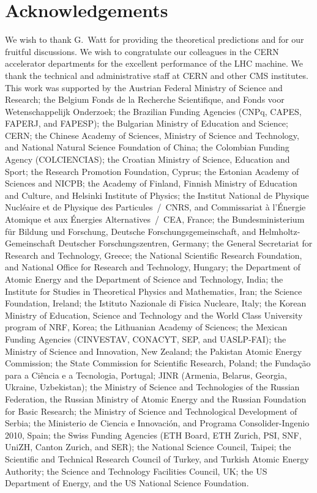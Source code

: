 \section*{Acknowledgements}
\label{sec:acknowledgements}

We wish to thank G.\ Watt for providing the theoretical predictions and for
our fruitful discussions.
We wish to congratulate our colleagues in the CERN accelerator departments 
for the excellent performance of the LHC machine. We thank the technical 
and administrative staff at CERN and other CMS institutes. This work was 
supported by the Austrian Federal Ministry of Science and Research; 
the Belgium Fonds de la Recherche Scientifique, 
and Fonds voor Wetenschappelijk Onderzoek; the Brazilian Funding 
Agencies (CNPq, CAPES, FAPERJ, and FAPESP); the Bulgarian Ministry 
of Education and Science; CERN; the Chinese Academy of Sciences, 
Ministry of Science and Technology, and National Natural Science 
Foundation of China; the Colombian Funding Agency (COLCIENCIAS); 
the Croatian Ministry of Science, Education and Sport; the Research 
Promotion Foundation, Cyprus; the Estonian Academy of Sciences and NICPB; 
the Academy of Finland, Finnish Ministry of Education and Culture, 
and Helsinki Institute of Physics; the Institut National de 
Physique Nucl\'eaire et de Physique des Particules~/~CNRS, 
and Commissariat \`a l'\'Energie Atomique et aux \'Energies Alternatives~/~CEA, France; 
the Bundesministerium f\"ur Bildung und Forschung, Deutsche Forschungsgemeinschaft, 
and Helmholtz-Gemeinschaft Deutscher Forschungszentren, Germany; 
the General Secretariat for Research and Technology, Greece; 
the National Scientific Research Foundation, and National Office for 
Research and Technology, Hungary; the Department of Atomic Energy and the 
Department of Science and Technology, India; the Institute for Studies in 
Theoretical Physics and Mathematics, Iran; the Science Foundation, Ireland; 
the Istituto Nazionale di Fisica Nucleare, Italy; the Korean Ministry of Education, 
Science and Technology and the World Class University program of NRF, Korea; 
the Lithuanian Academy of Sciences; the Mexican Funding Agencies (CINVESTAV, CONACYT, 
SEP, and UASLP-FAI); the Ministry of Science and Innovation, New Zealand; the Pakistan 
Atomic Energy Commission; the State Commission for Scientific Research, Poland; 
the Funda\c{c}\~ao para a Ci\^encia e a Tecnologia, Portugal; JINR (Armenia, Belarus, 
Georgia, Ukraine, Uzbekistan); the Ministry of Science and Technologies of the Russian 
Federation, the Russian Ministry of Atomic Energy and the Russian Foundation for Basic 
Research; the Ministry of Science and Technological Development of Serbia; 
the Ministerio de Ciencia e Innovaci\'on, and Programa Consolider-Ingenio 2010, Spain; 
the Swiss Funding Agencies (ETH Board, ETH Zurich, PSI, SNF, UniZH, Canton Zurich, and SER); 
the National Science Council, Taipei; the Scientific and Technical Research Council of Turkey, 
and Turkish Atomic Energy Authority; the Science and Technology Facilities Council, UK; 
the US Department of Energy, and the US National Science Foundation.

